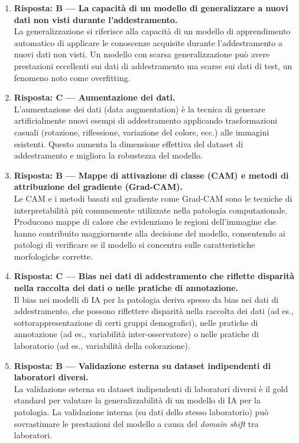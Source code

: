 \begin{enumerate}
    \item \textbf{Risposta: B --- La capacità di un modello di generalizzare a nuovi dati non visti
    durante l'addestramento.}\\
    La generalizzazione si riferisce alla capacità di un modello di apprendimento automatico di
    applicare le conoscenze acquisite durante l'addestramento a nuovi dati non visti. Un modello
    con scarsa generalizzazione può avere prestazioni eccellenti sui dati di addestramento ma
    scarse sui dati di test, un fenomeno noto come overfitting.

    \item \textbf{Risposta: C --- Aumentazione dei dati.}\\
    L'aumentazione dei dati (data augmentation) è la tecnica di generare artificialmente nuovi
    esempi di addestramento applicando trasformazioni casuali (rotazione, riflessione, variazione
    del colore, ecc.) alle immagini esistenti. Questo aumenta la dimensione effettiva del dataset
    di addestramento e migliora la robustezza del modello.

    \item \textbf{Risposta: B --- Mappe di attivazione di classe (CAM) e metodi di attribuzione
    del gradiente (Grad-CAM).}\\
    Le CAM e i metodi basati sul gradiente come Grad-CAM sono le tecniche di interpretabilità più
    comunemente utilizzate nella patologia computazionale. Producono mappe di calore che
    evidenziano le regioni dell'immagine che hanno contribuito maggiormente alla decisione del
    modello, consentendo ai patologi di verificare se il modello si concentra sulle caratteristiche
    morfologiche corrette.

    \item \textbf{Risposta: C --- Bias nei dati di addestramento che riflette disparità nella
    raccolta dei dati o nelle pratiche di annotazione.}\\
    Il bias nei modelli di IA per la patologia deriva spesso da bias nei dati di addestramento,
    che possono riflettere disparità nella raccolta dei dati (ad es., sottorappresentazione di
    certi gruppi demografici), nelle pratiche di annotazione (ad es., variabilità inter-osservatore)
    o nelle pratiche di laboratorio (ad es., variabilità della colorazione).

    \item \textbf{Risposta: B --- Validazione esterna su dataset indipendenti di laboratori
    diversi.}\\
    La validazione esterna su dataset indipendenti di laboratori diversi è il gold standard per
    valutare la generalizzabilità di un modello di IA per la patologia. La validazione interna
    (su dati dello stesso laboratorio) può sovrastimare le prestazioni del modello a causa del
    \emph{domain shift} tra laboratori.

\end{enumerate}

